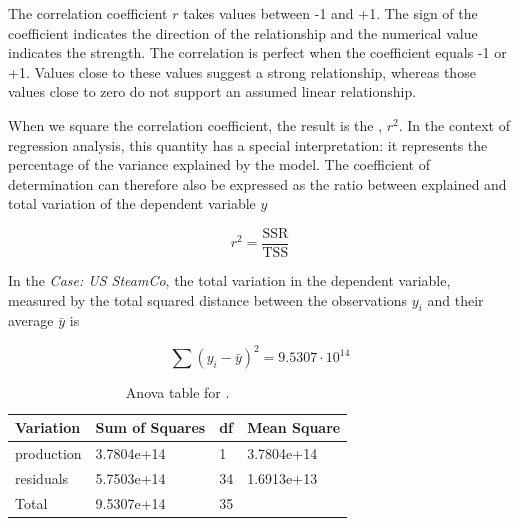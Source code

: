 \bigskip
The correlation coefficient $r$ takes values between -1 and +1. The sign of the coefficient indicates the direction of the relationship and the numerical value indicates the strength. The correlation is perfect when the coefficient equals -1 or +1. Values close to these values suggest a strong relationship, whereas those values close to zero do not support an assumed linear relationship. 

When we square the correlation coefficient, the result is the , $r^2$. 
In the context of regression analysis, this quantity has a special interpretation: it represents the percentage of the variance explained by the model. 
The coefficient of determination can therefore also be expressed as the ratio between explained and total variation of the dependent variable $y$

\begin{equation}
  r^2 = \frac{\text{SSR}}{\text{TSS}} 
\end{equation}

In the \textit{Case: US SteamCo}, the total variation in the dependent variable, measured by the total squared distance between the observations $y_i$ and their average $\bar{y}$ is 

\begin{equation*}
\sum{(y_i - \bar{y})^2} = 9.5307 \cdot 10^{14}
\end{equation*}

\begin{table}[htbp]

\begin{tabularx}{\textwidth}{X Y Y Y}

\toprule

\parbox[t]{1.7 cm}{Variation} &
Sum of Squares &
df &
Mean Square \\

\midrule

production & 3.7804e+14 & 1  & 3.7804e+14  \\
residuals  & 5.7503e+14 & 34 & 1.6913e+13  \\

\midrule

Total      & 9.5307e+14 & 35 &  \\

\bottomrule

\end{tabularx}

\caption{Anova table for .}
\label{tab:anova_mod0}
\end{table}

